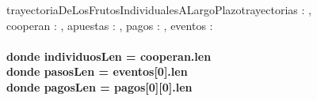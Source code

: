 \documentclass[document.tex]{subfiles}
\begin{document}
\begin{proc}{trayectoriaDeLosFrutosIndividualesALargoPlazo}{\Inout trayectorias : \TLista{\TLista{\float}},\\ \In cooperan : \TLista{\bool}, \In apuestas : \TLista{\TLista{\float}}, \In pagos : \TLista{\TLista{\float}}, \In eventos : \TLista{\TLista{\nat}}}{}
\hfill \\
\textbf{\\
donde individuosLen = cooperan.len \\
donde pasosLen = eventos[0].len \\
donde pagosLen = pagos[0][0].len \\
}
\end{proc}
\end{document}
